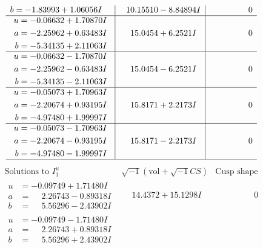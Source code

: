 \documentclass[1p]{elsarticle_modified}
\theoremstyle{definition}
\newcommand{\I}{\sqrt{-1}}
\begin{document}
$$\begin{array}{c|c|c}
\begin{aligned}
b &= -1.83993 + 1.06056 I\end{aligned}
 & \phantom{-}10.15510 - 8.84894 I & \phantom{-0.000000 } 0 \\ \hline\begin{aligned}
u &= -0.06632 + 1.70870 I \\
a &= -2.25962 + 0.63483 I \\
b &= -5.34135 + 2.11063 I\end{aligned}
 & \phantom{-}15.0454 + 6.2521 I & \phantom{-0.000000 } 0 \\ \hline\begin{aligned}
u &= -0.06632 - 1.70870 I \\
a &= -2.25962 - 0.63483 I \\
b &= -5.34135 - 2.11063 I\end{aligned}
 & \phantom{-}15.0454 - 6.2521 I & \phantom{-0.000000 } 0 \\ \hline\begin{aligned}
u &= -0.05073 + 1.70963 I \\
a &= -2.20674 + 0.93195 I \\
b &= -4.97480 + 1.99997 I\end{aligned}
 & \phantom{-}15.8171 + 2.2173 I & \phantom{-0.000000 } 0 \\ \hline\begin{aligned}
u &= -0.05073 - 1.70963 I \\
a &= -2.20674 - 0.93195 I \\
b &= -4.97480 - 1.99997 I\end{aligned}
 & \phantom{-}15.8171 - 2.2173 I & \phantom{-0.000000 } 0\\
 \hline 
 \end{array}$$\newpage$$\begin{array}{c|c|c}  
\text{Solutions to }I^u_{1}& \I (\text{vol} + \sqrt{-1}CS) & \text{Cusp shape}\\
 \hline 
\begin{aligned}
u &= -0.09749 + 1.71480 I \\
a &= \phantom{-}2.26743 - 0.89318 I \\
b &= \phantom{-}5.56296 - 2.43902 I\end{aligned}
 & \phantom{-}14.4372 + 15.1298 I & \phantom{-0.000000 } 0 \\ \hline\begin{aligned}
u &= -0.09749 - 1.71480 I \\
a &= \phantom{-}2.26743 + 0.89318 I \\
b &= \phantom{-}5.56296 + 2.43902 I\end{aligned}

\end{array}$$
\end{document}
